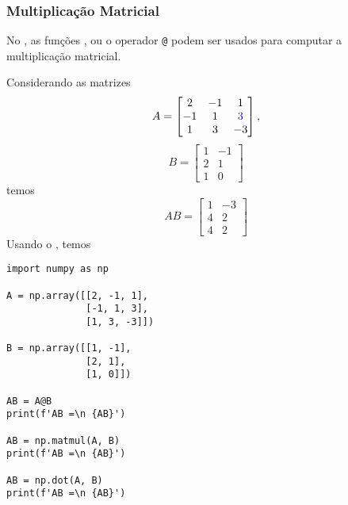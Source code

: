 \subsubsection{Multiplicação Matricial}

No {\numpy}, as funções {\PYTHONnumpyDOTdot}, {\PYTHONnumpyDOTmatmul} ou o operador \lstinline+@+ podem ser usados para computar a multiplicação matricial.

\begin{ex}
  Considerando as matrizes
  \begin{equation}
    A =
    \begin{bmatrix}
      2 & -1 & 1\\
      -1 & 1 & {\color{blue}3}\\
      1 & 3 & -3
    \end{bmatrix},
  \end{equation}
  \begin{equation}
    B =
    \begin{bmatrix}
      1 & -1\\
      2 & 1\\
      1 & 0
    \end{bmatrix}
  \end{equation}
  temos
  \begin{equation}
    AB =
    \begin{bmatrix}
      1 & -3\\
      4 & 2\\
      4 & 2
    \end{bmatrix}
  \end{equation}
  Usando o {\numpy}, temos

\begin{lstlisting}
import numpy as np

A = np.array([[2, -1, 1],
              [-1, 1, 3],
              [1, 3, -3]])

B = np.array([[1, -1],
              [2, 1],
              [1, 0]])

AB = A@B
print(f'AB =\n {AB}')

AB = np.matmul(A, B)
print(f'AB =\n {AB}')

AB = np.dot(A, B)
print(f'AB =\n {AB}')
\end{lstlisting}

\end{ex}

